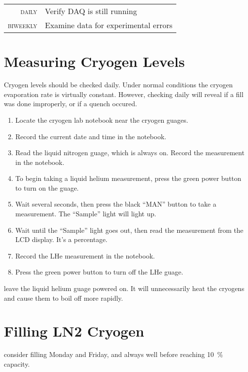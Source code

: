 \begin{table}[h]\begin{tabular}{>{\scshape}r p{\textwidth}}
    daily & Verify DAQ is still running\\
    biweekly & Examine data for experimental errors
\end{tabular}\end{table}

\section{Measuring Cryogen Levels}
\label{sec:op_maintenance:cryogen_levels}

Cryogen levels should be checked daily.  Under normal conditions the cryogen evaporation rate is virtually constant.  However, checking daily will reveal if a fill was done improperly, or if a \gls{quench} occured.  

\begin{enumerate}
\item Locate the cryogen lab notebook near the cryogen guages.
\item Record the current date and time in the notebook.
\item Read the liquid nitrogen guage, which is always on.  Record the measurement in the notebook.
\item To begin taking a liquid helium measurement, press the green power button to turn on the guage.
\item Wait several seconds, then press the black ``MAN'' button to take a measurement.  The ``Sample'' light will light up.
\item Wait until the ``Sample'' light goes out, then read the measurement from the LCD display.  It's a percentage.
\item Record the LHe measurement in the notebook.
\item Press the green power button to turn off the LHe guage.
\end{enumerate}

\begin{pleasedonot}
  leave the liquid helium guage powered on.  It will unnecessarily heat the cryogens and cause them to boil off more rapidly.
\end{pleasedonot}

\section{Filling LN2 Cryogen}
\label{sec:op_maintenance:filling_ln2}
\begin{pleasedo} consider filling Monday and Friday, and always well before reaching 10~\% capacity. \end{pleasedo}


